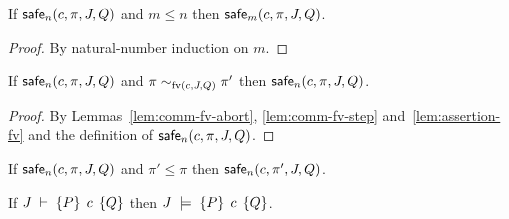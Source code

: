 \documentclass[11pt]{report}
\begin{document}
\begin{lemma}
	\label{lem:safe-monotonic}
	If $\mathsf{safe}_{n}(c,\pi,J,Q)$ and $m \leq n$ then $\mathsf{safe}_{m}(c,\pi,J,Q)$. 
\end{lemma}

\begin{proof}
	By natural-number induction on $m$. 
\end{proof}

\begin{lemma}
	\label{lem:save-fv}
	If $\mathsf{safe}_{n}(c,\pi,J,Q)$ and $\pi \sim_{\mathrm{fv}(c,J,Q)} \pi'$ then $\mathsf{safe}_{n}(c,\pi,J,Q)$. 
\end{lemma}

\begin{proof}
	By Lemmas~\ref{lem:comm-fv-abort}, \ref{lem:comm-fv-step} and~\ref{lem:assertion-fv} and the definition of $\mathsf{safe}_{n}(c,\pi,J,Q)$.
\end{proof}

\begin{lemma}\label{lem:safe-tau}
	If $\mathsf{safe}_{n}(c,\pi,J,Q)$ and $\pi' \leq \pi$ then $\mathsf{safe}_{n}(c,\pi',J,Q)$. 
\end{lemma}

\begin{theorem}
	\label{thm:sequential-soundness}
	If $J\;\vdash\;\left\lbrace P \right\rbrace\;c\;\left\lbrace Q \right\rbrace$ then $J\;\models\;\left\lbrace P \right\rbrace\;c\;\left\lbrace Q \right\rbrace$. 
\end{theorem}
\end{document}
